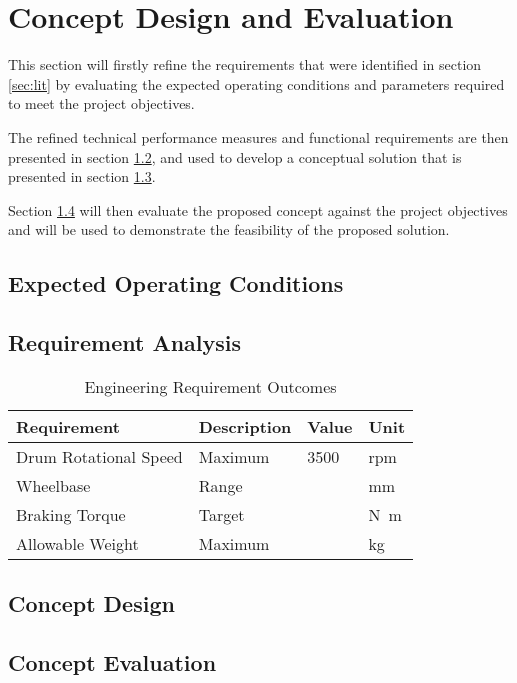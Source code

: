 
\chapter{Concept Design and Evaluation}

This section will firstly refine the requirements that were identified in section \ref{sec:lit} by evaluating the expected operating conditions and parameters required to meet the project objectives. 

The refined technical performance measures and functional requirements are then presented in section \ref{sec:req}, and used to develop a conceptual solution that is presented in section \ref{sec:conc}. 

Section \ref{sec:eval} will then evaluate the proposed concept against the project objectives and will be used to demonstrate the feasibility of the proposed solution.

\newpage
\section{Expected Operating Conditions}


\newpage

\section{Requirement Analysis}
\label{sec:req}

\begin{table}[H]
	\centering
	\caption{Engineering Requirement Outcomes}
	\begin{tabularx}{\textwidth}{>{\raggedright}X >{\raggedright}p{4cm} >{\raggedright}p{2cm} >{\raggedright\arraybackslash}p{1.5cm}}
		\toprule
		Requirement           & Description & Value & Unit               \\
		\midrule
		Drum Rotational Speed & Maximum     & 3500  & \acs{rpm}          \\
		Wheelbase             & Range       &       & \si{\milli\meter}  \\
		Braking Torque        & Target      &       & \si{\newton\meter} \\
		Allowable Weight      & Maximum     &       & \si{\kilogram}     \\
		\bottomrule
	\end{tabularx}
	\label{tab:conditions}
\end{table}

\section{Concept Design}
\label{sec:conc}

\section{Concept Evaluation}
\label{sec:eval}